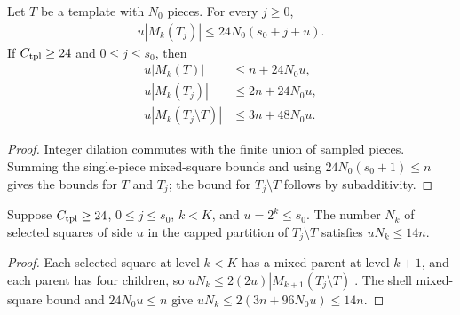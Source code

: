 \begin{lemma}
    \label{thm:area_law_template_shell_mixed_count}
    \leanok
    Let $T$ be a template with $N_0$ pieces. For every $j\ge0$,
    \begin{align}
        u|M_k(T_j)|\le24N_0(s_0+j+u).
    \end{align}
    If $C_{\rm tpl}\ge24$ and $0\le j\le s_0$, then
    \begin{align}
        u|M_k(T)|              & \le n+24N_0u, \\
        u|M_k(T_j)|            & \le2n+24N_0u, \\
        u|M_k(T_j\setminus T)| & \le3n+48N_0u.
    \end{align}
\end{lemma}
\begin{proof}\leanok
    Integer dilation commutes with the finite union of sampled
    pieces. Summing the single-piece mixed-square bounds and using
    $24N_0(s_0+1)\le n$ gives the bounds for $T$ and $T_j$; the bound for
    $T_j\setminus T$ follows by subadditivity.
\end{proof}

\begin{lemma}
    \label{thm:area_law_template_shell_selected_count}
    \leanok
    Suppose $C_{\rm tpl}\ge24$, $0\le j\le s_0$, $k<K$, and $u=2^k\le s_0$.
    The number $N_k$ of selected squares of side $u$ in the capped partition
    of $T_j\setminus T$ satisfies $uN_k\le14n$.
\end{lemma}
\begin{proof}\leanok
    Each selected square at level $k<K$ has a mixed parent at level $k+1$, and
    each parent has four children, so $uN_k\le2(2u)|M_{k+1}(T_j\setminus T)|$.
    The shell mixed-square bound and $24N_0u\le n$ give
    $uN_k\le2(3n+96N_0u)\le14n$.
\end{proof}


